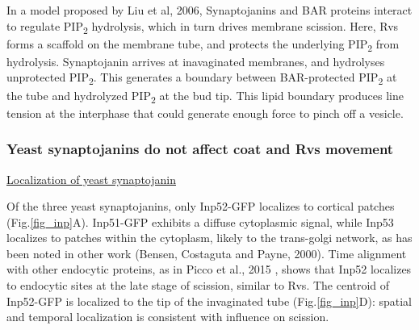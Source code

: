 \vspace{5mm}
In a model proposed by Liu et al, 2006, Synaptojanins and BAR proteins interact to regulate PIP\textsubscript{2} hydrolysis, which in turn drives membrane scission. Here, Rvs forms a scaffold on the membrane tube, and protects the underlying	PIP\textsubscript{2}  from hydrolysis. Synaptojanin arrives at inavaginated membranes, and hydrolyses unprotected	PIP\textsubscript{2}. This generates a boundary between BAR-protected 	PIP\textsubscript{2} at the tube and hydrolyzed PIP\textsubscript{2} at the bud tip. This lipid boundary produces line tension at the interphase that could generate enough force to pinch off a vesicle. 


	\subsubsection{Yeast synaptojanins do not affect coat and Rvs movement } 
	
\underline{Localization of yeast synaptojanin}


Of the three yeast synaptojanins, only Inp52-GFP localizes to cortical patches (Fig.\ref{fig_inp}A). Inp51-GFP exhibits a diffuse cytoplasmic signal, while Inp53 localizes to patches within the cytoplasm, likely to the trans-golgi network, as has been noted in other work (Bensen, Costaguta and Payne, 2000). Time alignment with other endocytic proteins, as in Picco et al., 2015 , shows that Inp52 localizes to endocytic sites at the late stage of scission, similar to Rvs. The centroid of Inp52-GFP is localized to the tip of the invaginated tube (Fig.\ref{fig_inp}D): spatial and temporal localization is consistent with influence on scission. 


